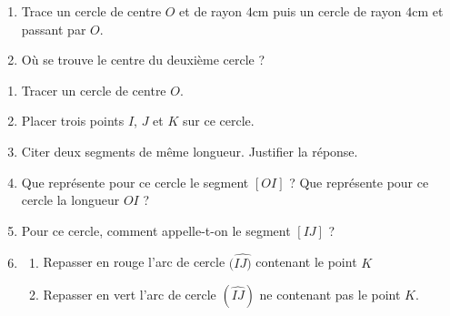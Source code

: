 \documentclass[a4paper,10pt]{report}
\begin{document}
\begin{ex}

\medskip
\begin{enumerate}
\item Trace un cercle de centre $O$ et de rayon $4$cm puis un cercle de rayon $4$cm et passant par $O$.
\item Où se trouve le centre du deuxième cercle ?
\end{enumerate}
\end{ex}

\begin{ex}

\medskip
\begin{enumerate}
\item Tracer un cercle de centre $O$.
\item Placer trois points $I$, $J$ et $K$ sur ce cercle.
\item Citer deux segments de même longueur. Justifier la réponse.
\item Que représente pour ce cercle le segment $[OI]$ ? Que représente pour ce cercle la longueur $OI$ ?
\item Pour ce cercle, comment appelle-t-on le segment $[IJ]$ ?
\item \begin{enumerate}
\item Repasser en rouge l'arc de cercle $(\widehat{IJ)}$ contenant le point $K$
\item Repasser en vert l'arc de cercle $(\widehat{IJ})$ ne contenant pas le point $K$.
\end{enumerate}
\end{enumerate}
\end{ex}
\end{document}
